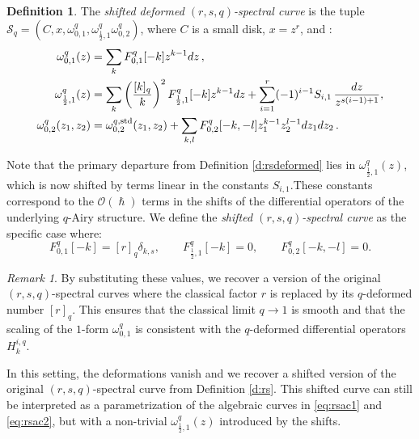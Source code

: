 \documentclass[reqno,11pt]{amsart}
\theoremstyle{plain}
\theoremstyle{definition}
\newtheorem{definition}[theorem]{Definition}
\theoremstyle{remark}
\newtheorem{remark}[theorem]{Remark}
\numberwithin{equation}{section}
\newcommand{\mc}[1]{\mathcal{#1}}
\newcommand{\1}{\mathds{1}}
\newcommand{\2}{\frac{1}{2}}
\begin{document}
{\begin{definition}
									The \emph{shifted deformed $(r,s,q)$-spectral curve} is the tuple $\mc{S}_q = (C, x, \omega^{q}_{0,1}, \omega^{q}_{\frac{1}{2},1} \omega^{q}_{0,2} ) $, where $C$ is a small disk, $x=z^r$, and :
									\begin{align}
										\omega^{q}_{0,1} (z)
										&= 
										\sum_k F^{q}_{0,1} [-k] z^{k-1} dz \,,
										\\
										\omega^{q}_{\frac{1}{2},1} (z)
										&=
										\sum_k\left( \frac{[k]_q}{k} \right)^2 F^{q}_{\frac{1}{2},1} [-k] z^{k-1} dz +\sum_{i=1}^{r}(-1)^{i-1}S_{i,1}\,\frac{dz}{z^{s(i-1)+1}},
										\\
										\omega^{q}_{0,2} (z_1, z_2)
										&=
										\omega^{q,\textup{std}}_{0,2} (z_1, z_2) + \sum_{k,l} F^{q}_{0,2}[-k,-l] z_1^{k-1} z_2^{l-1} dz_1 dz_2\,.
									\end{align}
								\end{definition}
								Note that the primary departure from  Definition \ref{d:rsdeformed} lies in $\omega^{q}_{\frac{1}{2},1}(z)$, which is now shifted by terms linear in the constants $S_{i,1}$.These constants correspond to the $\mathcal{O}(\hslash)$ terms in the shifts of the differential operators of the underlying $q$-Airy structure. We define the \emph{shifted $(r,s,q)$-spectral curve} as the specific case where:
								\begin{equation}
									F^{q}_{0,1} [-k] = [r]_q \delta_{k,s}, \qquad F^{q}_{\frac{1}{2},1}[-k] = 0, \qquad F^{q}_{0,2}[-k,-l] =0.
								\end{equation}
								\begin{remark}
									By substituting these values, we recover a version of the original $(r,s,q)$-spectral curves where the classical factor $r$ is replaced by its $q$-deformed number $[r]_q$. This ensures that the classical limit $q\rightarrow 1$ is smooth and that the scaling of the $1$-form $\omega^q_{0,1}$ is consistent with the $q$-deformed differential operators $H^{i,q}_k$.
								\end{remark}
								In this setting, the deformations vanish and we recover a shifted version of the original $(r,s,q)$-spectral curve from Definition \ref{d:rs}. This shifted curve can still be interpreted as a parametrization of the algebraic curves in  \eqref{eq:rsac1} and \eqref{eq:rsac2}, but with a non-trivial $\omega^{q}_{\frac{1}{2},1}(z)$ introduced by the shifts.
								
}
\end{document}
